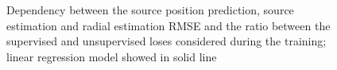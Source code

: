 \documentclass[applsci,article,submit,moreauthors,pdftex]{Definitions/mdpi}
\begin{document}
\begin{figure}[h!]
	\centering
	\caption{Dependency between the source position prediction, source \doa{} estimation  and radial estimation RMSE and the ratio between the supervised and unsupervised loses considered during the \grnn{} training; linear regression model showed in solid line}
	\label{fig:rmsemu}
\end{figure}
\end{document}
